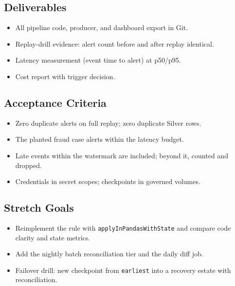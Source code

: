 \subsection*{Deliverables}
\begin{itemize}
    \item All pipeline code, producer, and dashboard export in Git.
    \item Replay-drill evidence: alert count before and after replay identical.
    \item Latency measurement (event time to alert) at p50/p95.
    \item Cost report with trigger decision.
\end{itemize}

\subsection*{Acceptance Criteria}
\begin{itemize}
    \item Zero duplicate alerts on full replay; zero duplicate Silver rows.
    \item The planted fraud case alerts within the latency budget.
    \item Late events within the watermark are included; beyond it, counted and dropped.
    \item Credentials in secret scopes; checkpoints in governed volumes.
\end{itemize}

\subsection*{Stretch Goals}
\begin{itemize}
    \item Reimplement the rule with \texttt{applyInPandasWithState} and compare code clarity and state metrics.
    \item Add the nightly batch reconciliation tier and the daily diff job.
    \item Failover drill: new checkpoint from \texttt{earliest} into a recovery estate with reconciliation.
\end{itemize}
